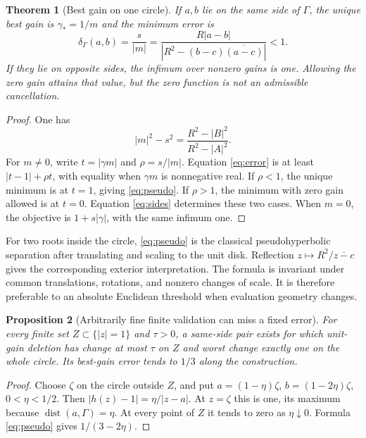 \documentclass[11pt]{article}
\newtheorem{theorem}{Theorem}[section]
\newtheorem{proposition}[theorem]{Proposition}
\theoremstyle{definition}\newtheorem{definition}[theorem]{Definition}
\begin{document}
\begin{theorem}[Best gain on one circle]\label{thm:single}
If $a,b$ lie on the same side of $\Gamma$, the unique best gain is $\gamma_*=1/m$ and the minimum error is
\begin{equation}
 \delta_\Gamma(a,b)=\frac{s}{|m|}
 =\frac{R|a-b|}{|R^2-(b-c)\overline{(a-c)}|}<1.\label{eq:pseudo}
\end{equation}
If they lie on opposite sides, the infimum over nonzero gains is one. Allowing the zero gain attains that value, but the zero function is not an admissible cancellation.
\end{theorem}
\begin{proof}
One has
\begin{equation}
 |m|^2-s^2=\frac{R^2-|B|^2}{R^2-|A|^2}.\label{eq:sides}
\end{equation}
For $m\ne0$, write $t=|\gamma m|$ and $\rho=s/|m|$. Equation \eqref{eq:error} is at least $|t-1|+\rho t$, with equality when $\gamma m$ is nonnegative real. If $\rho<1$, the unique minimum is at $t=1$, giving \eqref{eq:pseudo}. If $\rho>1$, the minimum with zero gain allowed is at $t=0$. Equation \eqref{eq:sides} determines these two cases. When $m=0$, the objective is $1+s|\gamma|$, with the same infimum one.
\end{proof}

For two roots inside the circle, \eqref{eq:pseudo} is the classical pseudohyperbolic separation after translating and scaling to the unit disk. Reflection $z\mapsto R^2/\overline{z-c}$ gives the corresponding exterior interpretation. The formula is invariant under common translations, rotations, and nonzero changes of scale. It is therefore preferable to an absolute Euclidean threshold when evaluation geometry changes.

\begin{proposition}[Arbitrarily fine finite validation can miss a fixed error]\label{prop:sample}
For every finite set $Z\subset\{|z|=1\}$ and $\tau>0$, a same-side pair exists for which unit-gain deletion has change at most $\tau$ on $Z$ and worst change exactly one on the whole circle. Its best-gain error tends to $1/3$ along the construction.
\end{proposition}
\begin{proof}
Choose $\zeta$ on the circle outside $Z$, and put $a=(1-\eta)\zeta$, $b=(1-2\eta)\zeta$, $0<\eta<1/2$. Then $|h(z)-1|=\eta/|z-a|$. At $z=\zeta$ this is one, its maximum because $\operatorname{dist}(a,\Gamma)=\eta$. At every point of $Z$ it tends to zero as $\eta\downarrow0$. Formula \eqref{eq:pseudo} gives $1/(3-2\eta)$.
\end{proof}
\end{document}
